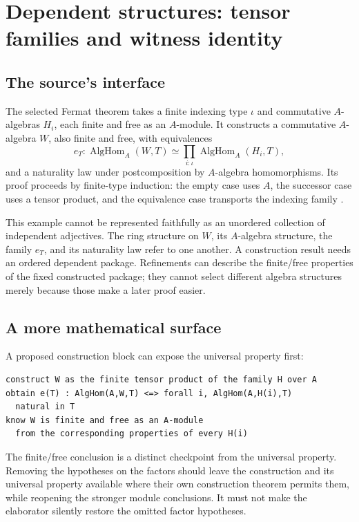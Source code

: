 \documentclass[11pt,a4paper]{article}
\theoremstyle{definition}\newtheorem{definition}[theorem]{Definition}
\theoremstyle{remark}\newtheorem{remark}[theorem]{Remark}
\begin{document}
\section{Dependent structures: tensor families and witness identity}\label{sec:tensor}

\subsection{The source's interface}
The selected Fermat theorem takes a finite indexing type $\iota$ and commutative $A$-algebras $H_i$, each finite and free as an $A$-module. It constructs a commutative $A$-algebra $W$, also finite and free, with equivalences
\begin{equation}\label{eq:represent}
 e_T:\operatorname{AlgHom}_A(W,T)
       \simeq\prod_{i:\iota}\operatorname{AlgHom}_A(H_i,T),
\end{equation}
and a naturality law under postcomposition by $A$-algebra homomorphisms. Its proof proceeds by finite-type induction: the empty case uses $A$, the successor case uses a tensor product, and the equivalence case transports the indexing family \cite{tensor}.

This example cannot be represented faithfully as an unordered collection of independent adjectives. The ring structure on $W$, its $A$-algebra structure, the family $e_T$, and its naturality law refer to one another. A construction result needs an ordered dependent package. Refinements can describe the finite/free properties of the fixed constructed package; they cannot select different algebra structures merely because those make a later proof easier.

\subsection{A more mathematical surface}
A proposed construction block can expose the universal property first:
\begin{lstlisting}
construct W as the finite tensor product of the family H over A
obtain e(T) : AlgHom(A,W,T) <=> forall i, AlgHom(A,H(i),T)
  natural in T
know W is finite and free as an A-module
  from the corresponding properties of every H(i)
\end{lstlisting}
The finite/free conclusion is a distinct checkpoint from the universal property. Removing the hypotheses on the factors should leave the construction and its universal property available where their own construction theorem permits them, while reopening the stronger module conclusions. It must not make the elaborator silently restore the omitted factor hypotheses.
\end{document}
